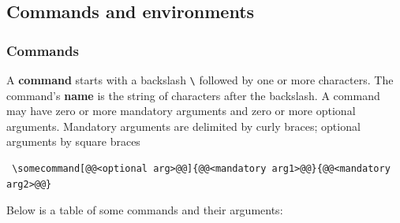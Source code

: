 \documentclass[a4paper,11pt]{scrartcl}\usepackage[]{graphicx}\usepackage[]{color}
\newcommand{\defi}[1]{\textbf{\textsf{#1}}}
\begin{document}
 
 \subsection{Commands and environments}
 \subsubsection{Commands}
 A \defi{command} starts with a backslash \verb=\= followed by one or more characters.
 The command's \defi{name} is the string of characters after the backslash. 
 A {command} may have zero or more mandatory arguments and zero or more optional arguments. 
 Mandatory arguments are delimited by curly braces; optional arguments by square braces

 \begin{lstlisting}
 \somecommand[@@<optional arg>@@]{@@<mandatory arg1>@@}{@@<mandatory arg2>@@}
 \end{lstlisting} 

 Below is a table of some commands and their arguments:
 
 \begin{table}[H]
 \raggedright
 \renewcommand{\arraystretch}{1.4}
 \newlength{\tabularxlength}
 \setlength{\tabularxlength}{\linewidth}
 \addtolength{\tabularxlength}{0.5\paperwidth}
 \addtolength{\tabularxlength}{-0.5\linewidth}
 \caption{Examples of commands and their arguments}
 \end{table}
 \clearpage
\end{document}

